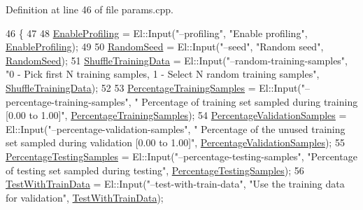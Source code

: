 Definition at line 46 of file params.\+cpp.


\begin{DoxyCode}
46                                        \{
47 
48   \hyperlink{classlbann_1_1TrainingParams_a45628c16fa42fb47276e1ebc34759bfa}{EnableProfiling} = El::Input(\textcolor{stringliteral}{"--profiling"}, \textcolor{stringliteral}{"Enable profiling"}, 
      \hyperlink{classlbann_1_1TrainingParams_a45628c16fa42fb47276e1ebc34759bfa}{EnableProfiling});
49 
50   \hyperlink{classlbann_1_1TrainingParams_a67d8fbbee9f7899f800aa3de688e9094}{RandomSeed} = El::Input(\textcolor{stringliteral}{"--seed"}, \textcolor{stringliteral}{"Random seed"}, \hyperlink{classlbann_1_1TrainingParams_a67d8fbbee9f7899f800aa3de688e9094}{RandomSeed});
51   \hyperlink{classlbann_1_1TrainingParams_a4cde94bdbbd82aabdb69e616194f74b1}{ShuffleTrainingData} = El::Input(\textcolor{stringliteral}{"--random-training-samples"}, \textcolor{stringliteral}{"0 - Pick first N
       training samples, 1 - Select N random training samples"}, \hyperlink{classlbann_1_1TrainingParams_a4cde94bdbbd82aabdb69e616194f74b1}{ShuffleTrainingData});
52 
53   \hyperlink{classlbann_1_1TrainingParams_a3763014b64c2e0396173221796a2bbfa}{PercentageTrainingSamples} = El::Input(\textcolor{stringliteral}{"--percentage-training-samples"}, \textcolor{stringliteral}{"
      Percentage of training set sampled during training [0.00 to 1.00]"}, 
      \hyperlink{classlbann_1_1TrainingParams_a3763014b64c2e0396173221796a2bbfa}{PercentageTrainingSamples});
54   \hyperlink{classlbann_1_1TrainingParams_a0dcb312e1714bfeec89a8119167d115f}{PercentageValidationSamples} = El::Input(\textcolor{stringliteral}{"--percentage-validation-samples"}, \textcolor{stringliteral}{"
      Percentage of the unused training set sampled during validation [0.00 to 1.00]"}, 
      \hyperlink{classlbann_1_1TrainingParams_a0dcb312e1714bfeec89a8119167d115f}{PercentageValidationSamples});
55   \hyperlink{classlbann_1_1TrainingParams_acd5f8e76266a47f83518a694ff89e303}{PercentageTestingSamples} = El::Input(\textcolor{stringliteral}{"--percentage-testing-samples"}, \textcolor{stringliteral}{"Percentage
       of testing set sampled during testing"}, \hyperlink{classlbann_1_1TrainingParams_acd5f8e76266a47f83518a694ff89e303}{PercentageTestingSamples});
56   \hyperlink{classlbann_1_1TrainingParams_a39a6893582111d1934c85f50c0111c1e}{TestWithTrainData} = El::Input(\textcolor{stringliteral}{"--test-with-train-data"}, \textcolor{stringliteral}{"Use the training data for
       validation"}, \hyperlink{classlbann_1_1TrainingParams_a39a6893582111d1934c85f50c0111c1e}{TestWithTrainData});

\end{DoxyCode}

